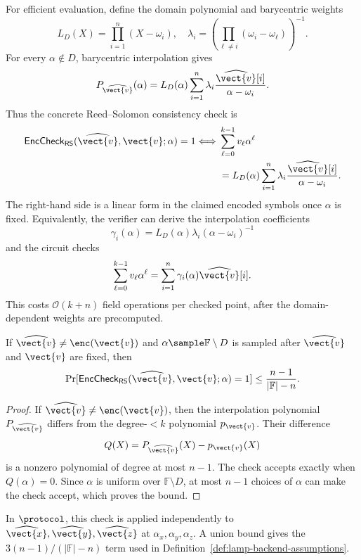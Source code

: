 For efficient evaluation, define the domain polynomial and barycentric weights
\[
  L_D(X)=\prod_{i=1}^{n}(X-\omega_i),
  \quad
  \lambda_i
  =
  \left(\prod_{\ell\neq i}(\omega_i-\omega_\ell)\right)^{-1}.
\]
For every \(\alpha\notin D\), barycentric interpolation gives
\[
  P_{\widehat{\vect{v}}}(\alpha)
  =
  L_D(\alpha)
  \sum_{i=1}^{n}
  \lambda_i
  \frac{\widehat{\vect{v}}[i]}{\alpha-\omega_i}.
\]
Thus the concrete Reed--Solomon consistency check is
\[
\begin{aligned}
\mathsf{EncCheck}_{\mathsf{RS}}
(\widehat{\vect{v}},\vect{v};\alpha)=1
\Longleftrightarrow{}&
\sum_{\ell=0}^{k-1} v_\ell \alpha^\ell
\\
&=
L_D(\alpha)
\sum_{i=1}^{n}
\lambda_i
\frac{\widehat{\vect{v}}[i]}{\alpha-\omega_i}.
\end{aligned}
\]
The right-hand side is a linear form in the claimed encoded symbols once
\(\alpha\) is fixed.  Equivalently, the verifier can derive the interpolation
coefficients
\[
  \gamma_i(\alpha)
  =
  L_D(\alpha)\lambda_i(\alpha-\omega_i)^{-1}
\]
and the circuit checks
\[
  \sum_{\ell=0}^{k-1} v_\ell \alpha^\ell
  =
  \sum_{i=1}^{n}\gamma_i(\alpha)\widehat{\vect{v}}[i].
\]
This costs \(\mathcal{O}(k+n)\) field operations per checked point, after the
domain-dependent weights are precomputed.

\begin{lemma}
\label{lem:rs-barycentric-soundness}
If \(\widehat{\vect{v}}\neq\enc(\vect{v})\) and
\(\alpha\sample\mathbb{F}\setminus D\) is sampled after
\(\widehat{\vect{v}}\) and \(\vect{v}\) are fixed, then
\[
  \Pr[
    \mathsf{EncCheck}_{\mathsf{RS}}
    (\widehat{\vect{v}},\vect{v};\alpha)=1
  ]
  \le
  \frac{n-1}{|\mathbb{F}|-n}.
\]
\end{lemma}

\begin{proof}
If \(\widehat{\vect{v}}\neq\enc(\vect{v})\), then the interpolation polynomial
\(P_{\widehat{\vect{v}}}\) differs from the degree-\(<k\) polynomial
\(p_{\vect{v}}\).  Their difference
\[
  Q(X)=P_{\widehat{\vect{v}}}(X)-p_{\vect{v}}(X)
\]
is a nonzero polynomial of degree at most \(n-1\).  The check accepts exactly
when \(Q(\alpha)=0\).  Since \(\alpha\) is uniform over
\(\mathbb{F}\setminus D\), at most \(n-1\) choices of \(\alpha\) can make the
check accept, which proves the bound.
\end{proof}

In \(\protocol\), this check is applied independently to
\(\widehat{\vect{x}},\widehat{\vect{y}},\widehat{\vect{z}}\) at
\(\alpha_x,\alpha_y,\alpha_z\).  A union bound gives the
\(3(n-1)/(|\mathbb{F}|-n)\) term used in
Definition~\ref{def:lamp-backend-assumptions}.

